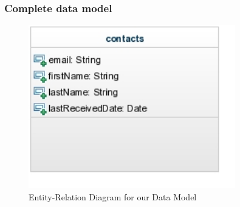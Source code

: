 \documentclass{article}
\begin{document}

\subsubsection{Complete data model}
\begin{figure}[H]
\centering
\includegraphics[width=90mm]{img/db_erd.jpg}
\caption{Entity-Relation Diagram for our Data Model \label{db_erd}}
\end{figure}




\end{document}
